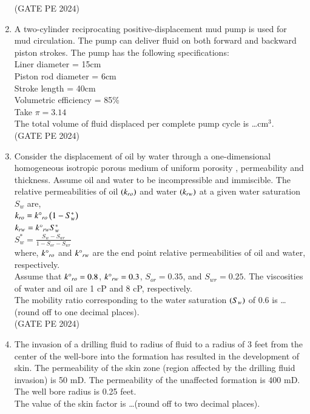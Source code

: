 \documentclass[journal,12pt,onecolumn]{IEEEtran}
\theoremstyle{remark}
\begin{document}
\begin{enumerate}
\hfill{(GATE PE 2024)}

\item A two-cylinder reciprocating positive-displacement mud pump is used for mud circulation. The pump can deliver fluid on both forward and backward piston strokes. The pump has the following specifications:\\
Liner diameter = 15cm\\
Piston rod diameter = 6cm\\
Stroke length = 40cm\\
Volumetric efficiency = 85\%\\
Take $\pi = 3.14$\\
The total volume of fluid displaced per complete pump cycle is \dots cm$^3$.\\


\hfill{(GATE PE 2024)}

\item Consider the displacement of oil by water through a one-dimensional homogeneous isotropic porous medium of uniform porosity , permeability and thickness. Assume oil and water to be incompressible and immiscible. The relative permeabilities of oil $\left(k_{ro}\right)$ and water $\left(k_{rw}\right)$ at a given water saturation $S_w$ are,\\
$k_{ro}=k\degree_{ro}\left(1-S_w^*\right)$\\
$k_{rw}=k\degree_{rw}S_w^*$\\
$S^*_w=\frac{S_w-S_{wr}}{1-S_{or}-S_{wr}}$\\
where, $k\degree_{ro}$ and $k\degree_{rw}$ are the end point relative permeabilities of oil and water, respectively.\\
Assume that $k\degree_{ro}=0.8$, $k\degree_{rw}=0.3$, $S_{or}=0.35$, and $S_{wr}=0.25$. The viscosities of water and oil are 1 cP and 8 cP, respectively.\\
The mobility ratio corresponding to the water saturation $\left(S_w\right)$ of 0.6 is \dots (round off to one decimal places).\\

\hfill{(GATE PE 2024)}

\item The invasion of a drilling fluid to radius of fluid  to a radius of 3 feet from the center of the well-bore into the formation has resulted in the development of skin. The permeability of the skin zone (region affected by the drilling fluid invasion) is 50 mD. The permeability of the unaffected formation is 400 mD. The well bore radius is 0.25 feet.\\
The value of the skin factor is \dots (round off to two decimal places).\\


\end{enumerate}
\end{document}

